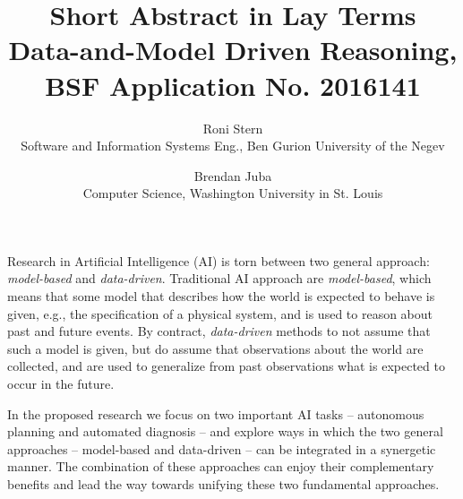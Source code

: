 \documentclass[12pt]{article}
\begin{document}
\title{Short Abstract in Lay Terms \\ \Large{Data-and-Model Driven Reasoning, BSF Application No. 2016141}}
\date{\vspace{-0.5cm}}
\author{Roni Stern \\ Software and Information Systems Eng., Ben Gurion University of the Negev
        \and Brendan Juba \\ Computer Science, Washington University in St. Louis}
\maketitle

Research in Artificial Intelligence (AI) is torn between two general approach: {\em model-based} and {\em data-driven}. 
Traditional AI approach are {\em model-based}, which means that some model that describes how the world is expected to behave is given, e.g., the specification of a physical system, and is used to reason about past and future events. By contract, {\em data-driven} methods to not assume that such a model is given, but do assume that observations about the world are collected, and are used to generalize from past observations what is expected to occur in the future. 


In the proposed research we focus on two important AI tasks -- autonomous planning and automated diagnosis -- and explore ways in which the two general approaches -- model-based and data-driven -- 
can be integrated in a synergetic manner. The combination of these approaches can enjoy their complementary benefits and lead the way towards unifying these two fundamental approaches. 
\end{document}
